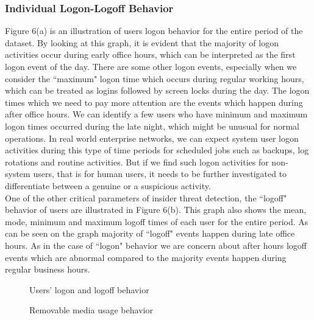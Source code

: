 \documentclass[conference,draftclsnofoot,onecolumn]{IEEEtran}%
\begin{document}
\subsubsection{Individual Logon-Logoff Behavior}
Figure 6(a) is an illustration of users logon behavior for the entire period of the dataset. By looking at this graph, it is evident that the majority of logon activities occur during early office hours, which can be interpreted as the first logon event of the day. There are some other logon events, especially when we consider the ``maximum" logon time which occurs during regular working hours, which can be treated as logins followed by screen locks during the day. The logon times which we need to pay more attention are the events which happen during after office hours. We can identify a few users who have minimum and maximum logon times occurred during the late night, which might be unusual for normal operations. In real world enterprise networks, we can expect system user logon activities during this type of time periods for scheduled jobs such as backups, log rotations and routine activities. But if we find such logon activities for non-system users, that is for human users, it needs to be further investigated to differentiate between a genuine or a suspicious activity.\\
One of the other critical parameters of insider threat detection, the ``logoff" behavior of users are illustrated in Figure 6(b). This graph also shows the mean, mode, minimum and maximum logoff times of each user for the entire period. As can be seen on the graph majority of ``logoff" events happen during late office hours. As in the case of ``logon" behavior we are concern about after hours logoff events which are abnormal compared to the majority events happen during regular business hours.

\begin{figure*}[h]
		\centering
		\caption{Users' logon and logoff behavior}
		\label{figure 6}
		\vspace{-5pt}
\end{figure*}

\begin{figure*}[h]
		\centering
		\hfill
		\caption{Removable media usage behavior}
		\label{figure 7}
		\vspace{-5pt}
\end{figure*}
\end{document}
